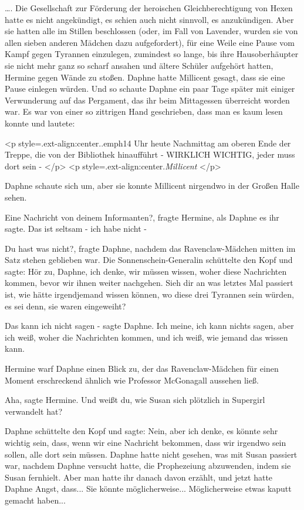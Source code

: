 …. Die Gesellschaft zur Förderung der heroischen Gleichberechtigung von Hexen
hatte es nicht angekündigt, es schien auch nicht sinnvoll, es anzukündigen. Aber
sie hatten alle im Stillen beschlossen (oder, im Fall von Lavender, wurden sie
von allen sieben anderen Mädchen dazu aufgefordert), für eine Weile eine Pause
vom Kampf gegen Tyrannen einzulegen, zumindest so lange, bis ihre
Hausoberhäupter sie nicht mehr ganz so scharf ansahen und ältere Schüler
aufgehört hatten, Hermine gegen Wände zu stoßen. Daphne hatte Millicent gesagt,
dass sie eine Pause einlegen würden. Und so schaute Daphne ein paar Tage später
mit einiger Verwunderung auf das Pergament, das ihr beim Mittagessen überreicht
worden war. Es war von einer so zittrigen Hand geschrieben, dass man es kaum
lesen konnte und lautete:

<p style=\grqq{}.ext-align:center\grqq{}.\grqq{}.emph{14 Uhr heute Nachmittag am
oberen Ende der Treppe, die von der Bibliothek hinaufführt - WIRKLICH WICHTIG,
jeder muss dort sein - }</p> <p
style=\grqq{}.ext-align:center\grqq{}.\emph{Millicent}\grqq{} </p>

Daphne schaute sich um, aber sie konnte Millicent nirgendwo in der Großen Halle
sehen.

\glqq Eine Nachricht von deinem Informanten?\grqq{}, fragte Hermine, als Daphne
es ihr sagte. \glqq Das ist seltsam - ich habe nicht -\grqq{}

\glqq Du hast was nicht?\grqq{}, fragte Daphne, nachdem das Ravenclaw-Mädchen
mitten im Satz stehen geblieben war. Die Sonnenschein-Generalin schüttelte den
Kopf und sagte: \glqq Hör zu, Daphne, ich denke, wir müssen wissen, woher diese
Nachrichten kommen, bevor wir ihnen weiter nachgehen. Sieh dir an was letztes
Mal passiert ist, wie hätte irgendjemand wissen können, wo diese drei Tyrannen
sein würden, es sei denn, sie waren eingeweiht?\grqq{}

\glqq Das kann ich nicht sagen -\grqq{} sagte Daphne. \glqq Ich meine, ich kann
nichts sagen, aber ich weiß, woher die Nachrichten kommen, und ich weiß, wie
jemand das wissen kann.\grqq{}

Hermine warf Daphne einen Blick zu, der das Ravenclaw-Mädchen für einen Moment
erschreckend ähnlich wie Professor McGonagall aussehen ließ.

\glqq Aha\grqq{}, sagte Hermine. \glqq Und weißt du, wie Susan sich plötzlich in
Supergirl verwandelt hat?\grqq{}

Daphne schüttelte den Kopf und sagte: \glqq Nein, aber ich denke, es könnte sehr
wichtig sein, dass, wenn wir eine Nachricht bekommen, dass wir irgendwo sein
sollen, alle dort sein müssen.\grqq{} Daphne hatte nicht gesehen, was mit Susan
passiert war, nachdem Daphne versucht hatte, die Prophezeiung abzuwenden, indem
sie Susan fernhielt. Aber man hatte ihr danach davon erzählt, und jetzt hatte
Daphne Angst, dass... Sie könnte möglicherweise... Möglicherweise etwas kaputt
gemacht haben...

